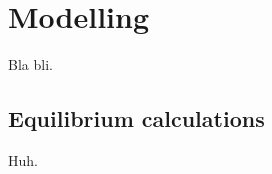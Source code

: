 \chapter{Modelling} \label{chp:models}
    Bla bli.

    \section{Equilibrium calculations} \label{sec:}
        Huh.

    \section{}